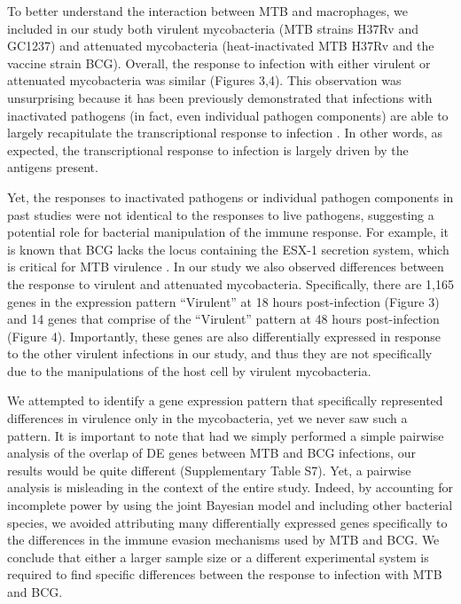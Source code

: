 To better understand the interaction between MTB and macrophages, we
included in our study both virulent mycobacteria (MTB strains H37Rv and
GC1237) and attenuated mycobacteria (heat-inactivated MTB H37Rv and the
vaccine strain BCG). Overall, the response to infection with either
virulent or attenuated mycobacteria was similar (Figures 3,4). This
observation was unsurprising because it has been previously demonstrated
that infections with inactivated pathogens (in fact, even individual
pathogen components) are able to largely recapitulate the
transcriptional response to infection \citep{Huang2001, Boldrick2002;
@Nau2002, Jenner2005}. In other words, as expected, the
transcriptional response to infection is largely driven by the antigens
present.

Yet, the responses to inactivated pathogens or individual pathogen
components in past studies were not identical to the responses to live
pathogens, suggesting a potential role for bacterial manipulation of the
immune response. For example, it is known that BCG lacks the locus
containing the ESX-1 secretion system, which is critical for MTB
virulence \citep{Behr1999, Pym2002, Hsu2003, Simeone2009}. In our
study we also observed differences between the response to virulent and
attenuated mycobacteria. Specifically, there are 1,165 genes in the
expression pattern ``Virulent'' at 18 hours post-infection (Figure 3)
and 14 genes that comprise of the ``Virulent'' pattern at 48 hours
post-infection (Figure 4). Importantly, these genes are also
differentially expressed in response to the other virulent infections in
our study, and thus they are not specifically due to the manipulations
of the host cell by virulent mycobacteria.

We attempted to identify a gene expression pattern that specifically
represented differences in virulence only in the mycobacteria, yet we
never saw such a pattern. It is important to note that had we simply
performed a simple pairwise analysis of the overlap of DE genes between
MTB and BCG infections, our results would be quite different
(Supplementary Table S7). Yet, a pairwise analysis is misleading in the
context of the entire study. Indeed, by accounting for incomplete power
by using the joint Bayesian model and including other bacterial species,
we avoided attributing many differentially expressed genes specifically
to the differences in the immune evasion mechanisms used by MTB and BCG.
We conclude that either a larger sample size or a different experimental
system is required to find specific differences between the response to
infection with MTB and BCG.

